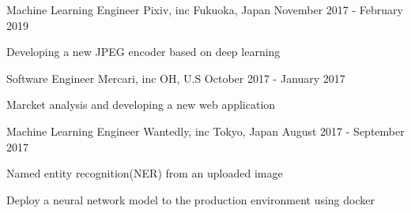 
\begin{cventries}
  \cventry
    {Machine Learning Engineer} %
    {Pixiv, inc} %
    {Fukuoka, Japan} %
    {November 2017 - February 2019} %
    {
      \begin{cvitems} %
        \item {Developing a new JPEG encoder based on deep learning}
      \end{cvitems}
    }
  \cventry
    {Software Engineer} %
    {Mercari, inc} %
    {OH, U.S} %
    {October 2017 - January 2017} %
    {
      \begin{cvitems} %
        \item {Marcket analysis and developing a new web application}
      \end{cvitems}
    }
  \cventry
    {Machine Learning Engineer} %
    {Wantedly, inc} %
    {Tokyo, Japan} %
    {August 2017 - September 2017} %
    {
      \begin{cvitems} %
        \item {Named entity recognition(NER) from an uploaded image}
        \item {Deploy a neural network model to the production environment using docker}
      \end{cvitems}
    }
\end{cventries}
